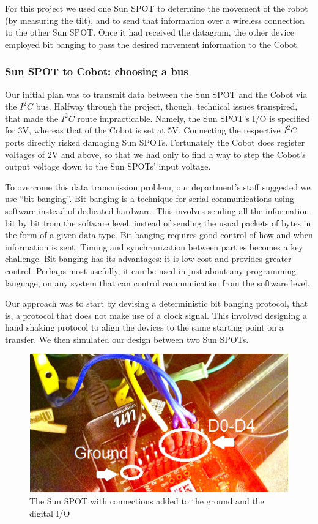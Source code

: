 \documentclass[a4paper,10pt]{article} %
\begin{document}
For this project we used one Sun SPOT to determine the movement of the robot (by
measuring the tilt), and to send that information over a wireless connection to
the other Sun SPOT. Once it had received the datagram, the other device employed
bit banging to pass the desired movement information to the Cobot.

\subsubsection{Sun SPOT to Cobot: choosing a bus} %
\label{ssub:bitbang}

Our initial plan was to transmit data between the Sun SPOT and the Cobot via the
$I^2C$ bus. Halfway through the project, though, technical issues transpired,
that made the $I^2C$ route impracticable. Namely, the Sun SPOT's I/O is
specified for 3V, whereas that of the Cobot is set at 5V. Connecting the
respective $I^2C$ ports directly risked damaging Sun SPOTs. Fortunately the
Cobot does register voltages of 2V and above, so that we had only to find a way
to step the Cobot's output voltage down to the Sun SPOTs' input voltage.

To overcome this data transmission problem, our department's staff suggested we
use ``bit-banging''. Bit-banging is a technique for serial communications using
software instead of dedicated hardware. This involves sending all the
information bit by bit from the software level, instead of sending the usual
packets of bytes in the form of a given data type. Bit banging requires good
control of how and when information is sent. Timing and synchronization between
parties becomes a key challenge. Bit-banging has its advantages: it is low-cost
and provides greater control. Perhaps most usefully, it can be used in just
about any programming language, on any system that can control communication
from the software level.

Our approach was to start by devising a deterministic bit banging protocol, that
is, a protocol that does not make use of a clock signal. This involved designing
a hand shaking protocol to align the devices to the same starting point on a
transfer. We then simulated our design between two Sun SPOTs.

\begin{figure}[H]
\label{fig:sunspotconnections}
\centering
\includegraphics{img/sunspotconnections1.png}
\caption{The Sun SPOT with connections added to the ground and the digital
I/O}
\end{figure}
\end{document}
